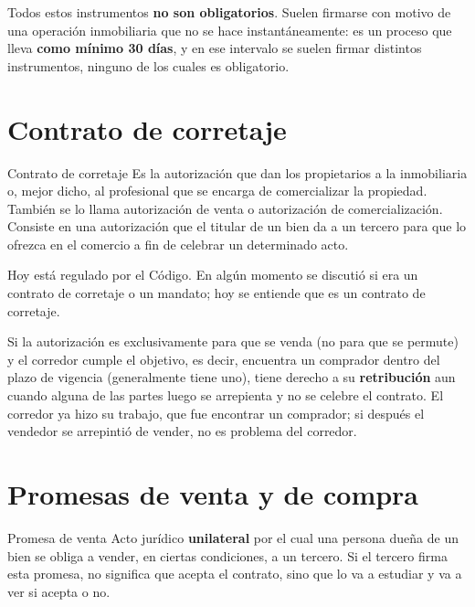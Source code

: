 \documentclass[12pt,oneside]{book}
\begin{document}
\begin{important}
Todos estos instrumentos \textbf{no son obligatorios}. Suelen firmarse con motivo de una operación inmobiliaria que no se hace instantáneamente: es un proceso que lleva \textbf{como mínimo 30 días}, y en ese intervalo se suelen firmar distintos instrumentos, ninguno de los cuales es obligatorio.
\end{important}

\section{Contrato de corretaje}

\begin{definition}{Contrato de corretaje}
Es la autorización que dan los propietarios a la inmobiliaria o, mejor dicho, al profesional que se encarga de comercializar la propiedad. También se lo llama autorización de venta o autorización de comercialización. Consiste en una autorización que el titular de un bien da a un tercero para que lo ofrezca en el comercio a fin de celebrar un determinado acto.
\end{definition}

Hoy está regulado por el Código. En algún momento se discutió si era un contrato de corretaje o un mandato; hoy se entiende que es un contrato de corretaje.

Si la autorización es exclusivamente para que se venda (no para que se permute) y el corredor cumple el objetivo, es decir, encuentra un comprador dentro del plazo de vigencia (generalmente tiene uno), tiene derecho a su \textbf{retribución} aun cuando alguna de las partes luego se arrepienta y no se celebre el contrato. El corredor ya hizo su trabajo, que fue encontrar un comprador; si después el vendedor se arrepintió de vender, no es problema del corredor.

\section{Promesas de venta y de compra}

\begin{definition}{Promesa de venta}
Acto jurídico \textbf{unilateral} por el cual una persona dueña de un bien se obliga a vender, en ciertas condiciones, a un tercero. Si el tercero firma esta promesa, no significa que acepta el contrato, sino que lo va a estudiar y va a ver si acepta o no.
\end{definition}
\end{document}
